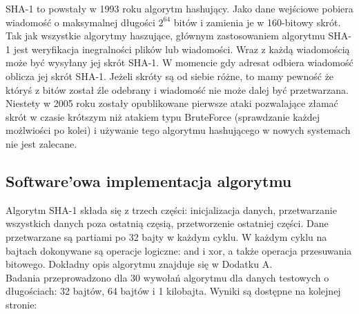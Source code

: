 \documentclass[oneside]{mgr}
\begin{document}
SHA-1 to powstały w 1993 roku algorytm hashujący. Jako dane wejściowe pobiera wiadomość o maksymalnej długości $2^{64}$ bitów i zamienia je w 160-bitowy skrót. Tak jak wszystkie algorytmy haszujące, głównym zastosowaniem algorytmu SHA-1 jest weryfikacja inegralności plików lub wiadomości. Wraz z każdą wiadomością może być wysyłany jej skrót SHA-1. W momencie gdy adresat odbiera wiadomość oblicza jej skrót SHA-1. Jeżeli skróty są od siebie różne, to mamy pewność że któryś z bitów został źle odebrany i wiadomość nie może dalej być przetwarzana. Niestety w 2005 roku zostały opublikowane pierwsze ataki pozwalające złamać skrót w czasie krótszym niż atakiem typu BruteForce (sprawdzanie każdej możlwiości po kolei) i używanie tego algorytmu hashującego w nowych systemach nie jest zalecane. 

\subsection{Software'owa implementacja algorytmu}

Algorytm SHA-1 składa się z trzech części: inicjalizacja danych, przetwarzanie wszystkich danych poza ostatnią częsią, przetworzenie ostatniej części. Dane przetwarzane są partiami po 32 bajty w każdym cyklu. W każdym cyklu na bajtach dokonywane są operacje logiczne: and i xor, a także operacja przesuwania bitowego. Dokładny opis algorytmu znajduje się w Dodatku A.\\
Badania przeprowadzono dla 30 wywołań algorytmu dla danych testowych o długościach: 32 bajtów, 64 bajtów i 1 kilobajta. Wyniki są dostępne na kolejnej stronie:
\end{document}
